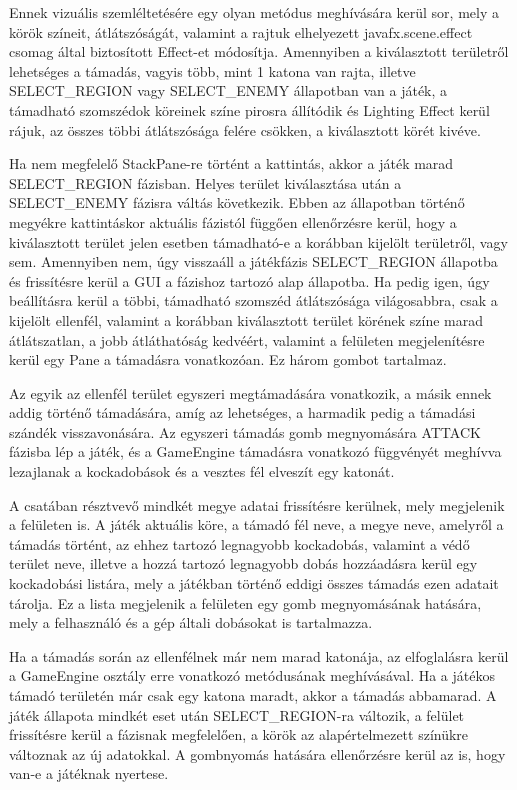 Ennek vizuális szemléltetésére egy olyan metódus meghívására kerül sor, mely a körök színeit, átlátszóságát, valamint a rajtuk elhelyezett javafx.scene.effect csomag által biztosított Effect-et módosítja. Amennyiben a kiválasztott területről lehetséges a támadás, vagyis több, mint 1 katona van rajta, illetve SELECT\_REGION vagy SELECT\_ENEMY állapotban van a játék, a támadható szomszédok köreinek színe pirosra állítódik és Lighting Effect kerül rájuk, az összes többi átlátszósága felére csökken, a kiválasztott körét kivéve. 

Ha nem megfelelő StackPane-re történt a kattintás, akkor a játék marad SELECT\_REGION fázisban. Helyes terület kiválasztása után a SELECT\_ENEMY fázisra váltás következik. Ebben az állapotban történő megyékre kattintáskor aktuális fázistól függően ellenőrzésre kerül, hogy a kiválasztott terület jelen esetben támadható-e a korábban kijelölt területről, vagy sem. Amennyiben nem, úgy visszaáll a játékfázis SELECT\_REGION állapotba és frissítésre kerül a GUI a fázishoz tartozó alap állapotba. Ha pedig igen, úgy beállításra kerül a többi, támadható szomszéd átlátszósága világosabbra, csak a kijelölt ellenfél, valamint a korábban kiválasztott terület körének színe marad átlátszatlan, a jobb átláthatóság kedvéért, valamint a felületen megjelenítésre kerül egy Pane a támadásra vonatkozóan. Ez három gombot tartalmaz. 

Az egyik az ellenfél terület egyszeri megtámadására vonatkozik, a másik ennek addig történő támadására, amíg az lehetséges, a harmadik pedig a támadási szándék visszavonására. Az egyszeri támadás gomb megnyomására ATTACK fázisba lép a játék, és a GameEngine támadásra vonatkozó függvényét meghívva lezajlanak a kockadobások és a vesztes fél elveszít egy katonát. 

A csatában résztvevő mindkét megye adatai frissítésre kerülnek, mely megjelenik a felületen is. A játék aktuális köre, a támadó fél neve, a megye neve, amelyről a támadás történt, az ehhez tartozó legnagyobb kockadobás, valamint a védő terület neve, illetve a hozzá tartozó legnagyobb dobás hozzáadásra kerül egy kockadobási listára, mely a játékban történő eddigi összes támadás ezen adatait tárolja. Ez a lista megjelenik a felületen egy gomb megnyomásának hatására, mely a felhasználó és a gép általi dobásokat is tartalmazza. 

Ha a támadás során az ellenfélnek már nem marad katonája, az elfoglalásra kerül a GameEngine osztály erre vonatkozó metódusának meghívásával. Ha a játékos támadó területén már csak egy katona maradt, akkor a támadás abbamarad. A játék állapota mindkét eset után SELECT\_REGION-ra változik, a felület frissítésre kerül a fázisnak megfelelően, a körök az alapértelmezett színükre változnak az új adatokkal. A gombnyomás hatására ellenőrzésre kerül az is, hogy van-e a játéknak nyertese. 

